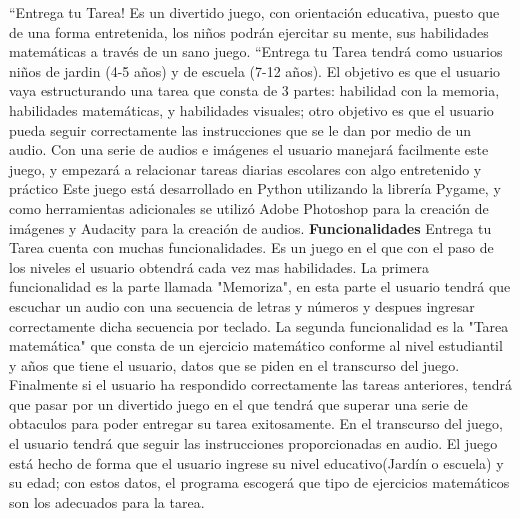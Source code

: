 \documentclass[12pt]{report}
\begin{document}
``Entrega tu Tarea! Es un divertido juego, con orientación educativa, puesto que de una forma entretenida, los niños podrán ejercitar su mente, sus habilidades matemáticas a través de un sano juego.
\newline
\newline
``Entrega tu Tarea tendrá como usuarios niños de jardin (4-5 años)  y de escuela (7-12 años). El objetivo es que el usuario vaya estructurando una tarea que consta de 3 partes: habilidad con la memoria, habilidades matemáticas, y habilidades visuales; otro objetivo es que el usuario pueda seguir correctamente las instrucciones que se le dan por medio de un audio.
\newline
\newline
Con una serie de audios e imágenes el usuario manejará facilmente este juego, y empezará a relacionar tareas diarias escolares con algo entretenido y práctico
\newline
\newline
Este juego está desarrollado en Python utilizando la librería Pygame, y como herramientas adicionales se utilizó Adobe Photoshop para la creación de imágenes y Audacity para la creación de audios.
	\newline
	\newline
	\newline
	\begingroup
		\large{
			\textbf{
				Funcionalidades
				\newline
				\newline
			}
		}
	\endgroup
\newline
Entrega tu Tarea cuenta con muchas funcionalidades. Es un juego en el que con el paso de los niveles el usuario obtendrá cada vez mas habilidades.
\newline
\newline
La primera funcionalidad es la parte llamada "Memoriza", en esta parte el usuario tendrá que escuchar un audio con una secuencia de letras y números y despues ingresar correctamente dicha secuencia por teclado.
\newline
\newline
La segunda funcionalidad es la "Tarea matemática"  que consta de un ejercicio matemático conforme al nivel estudiantil y años que tiene el usuario, datos que se piden en el transcurso del juego.	
\newline
\newline	
Finalmente si el usuario ha respondido correctamente las tareas anteriores, tendrá que pasar por un divertido juego en el que tendrá que superar una serie de obtaculos para poder entregar su tarea exitosamente.
\newline
\newline
En el transcurso del juego, el usuario tendrá que seguir las instrucciones proporcionadas en audio.
\newline
\newline
El juego está hecho de forma que el usuario ingrese su nivel educativo(Jardín o escuela) y su edad; con estos datos, el programa escogerá que tipo de ejercicios matemáticos son los adecuados para la tarea.
\end{document}
